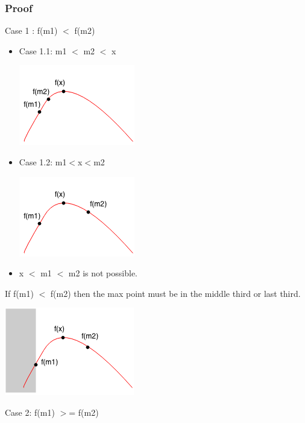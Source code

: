 \documentclass[11pt,oneside]{book}
\makeatletter
\def\maxwidth#1{\ifdim\Gin@nat@width>#1 #1\else\Gin@nat@width\fi}
\makeatother
\begin{document}
\subsubsection{Proof}

Case 1 : f(m1) $<$ f(m2)

\begin{itemize}
\item Case 1.1:  m1 $<$ m2 $<$ x

\includegraphics[width=\maxwidth{\textwidth}]{ternarycase11.png}
\item Case 1.2: m1$<$x$<$m2

\includegraphics[width=\maxwidth{\textwidth}]{ternarycase12.png}
\item x $<$ m1 $<$ m2 is not possible.
\end{itemize}

If f(m1) $<$ f(m2) then the max point must be in the middle third or last third.

\includegraphics[width=\maxwidth{\textwidth}]{ternarycase1.png}

Case 2: f(m1) $>$= f(m2)
\end{document}
